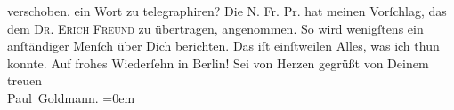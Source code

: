 \begin{ledgroupsized}[t]{13cm}
{{{                  verschoben.}}}\label{K_L02938-2h} ein Wort zu telegraphiren?\pend
           \pstart
           Die N. Fr. Pr. hat meinen Vorſchlag, das \label{K_L02938-3v}\label{K_L02938-3h} dem \textsc{Dr.}{ }{\pb}\textsc{Erich Freund} zu übertragen, angenommen. So wird wenigſtens ein anſtändiger Menſch über Dich berichten. Das iſt
               einſtweilen Alles, was ich thun konnte.\pend
           \pstart
           Auf frohes Wiederſehn in Berlin!\pend
           \pstart
           Sei von Herzen gegrüßt von Deinem {\\[\baselineskip]}treuen {\\[\baselineskip]}\spacefill\mbox{Paul Goldmann.}\pend
           \leftskip=0em{}
         
         \endnumbering{}\end{ledgroupsized}  \newcommand{\dateiname}{L02938}\newcommand{\titel}{Paul Goldmann an Arthur Schnitzler, 12. 11. [1900]}\newcommand{\editorInnen}{Martin Anton Müller und Laura Untner}
      